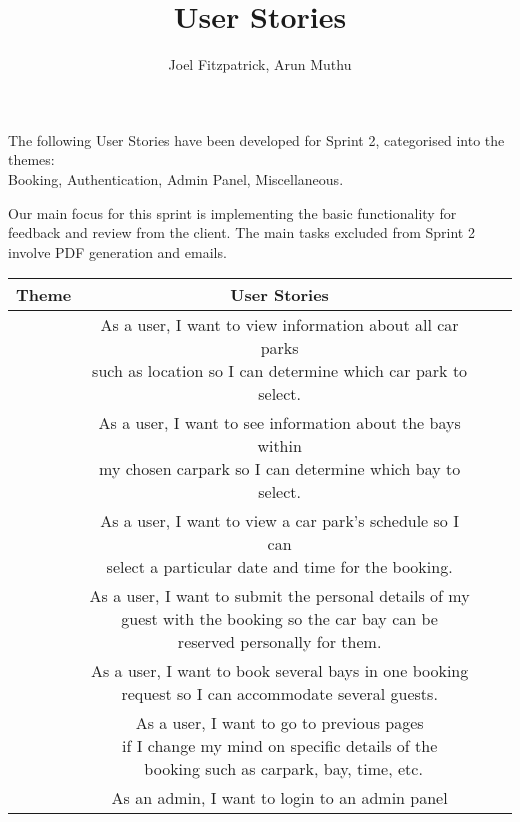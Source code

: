 \documentclass[a4paper, 10pt]{article}
\title{User Stories}
\author{Joel Fitzpatrick, Arun Muthu}
\begin{document}
\setlength{\headsep}{0pt}

\maketitle

\noindent
The following User Stories have been developed for Sprint 2, categorised into the themes: \\
Booking, Authentication, Admin Panel, Miscellaneous.

Our main focus for this sprint is implementing the basic functionality for feedback and review from the client. 
The main tasks excluded from Sprint 2 involve PDF generation and emails.

\vspace*{1em}
\begin{tabular}[hbt!]{|>{\centering\arraybackslash}m{7em}|c|c|c|}
    \hline
    Theme & User Stories \\
    \hline
    \multirow{6}{*}{Booking} & 
    \makecell{As a user, I want to view information about all car parks \\ 
    such as location so I can determine which car park to select.} \\
    \cline{2-2}
    & \makecell{As a user, I want to see information about the bays within \\
    my chosen carpark so I can determine which bay to select.} \\
    \cline{2-2}
    & \makecell{As a user, I want to view a car park’s schedule so I can \\ 
    select a particular date and time for the booking.} \\
    \cline{2-2}
    & \makecell{As a user, I want to submit the personal details of my \\ 
    guest with the booking so the car bay can be \\
    reserved personally for them.} \\
    \cline{2-2}
    & \makecell{As a user, I want to book several bays in one booking \\
    request so I can accommodate several guests.} \\
    \cline{2-2}
    & \makecell{As a user, I want to go to previous pages \\
    if I change my mind on specific details of the \\\
    booking such as carpark, bay, time, etc.} \\
    \hline
    \multirow{2}{*}{Authentication} & 
    \makecell{As an admin, I want to login to an admin panel \\ 
}
\end{tabular}
\end{document}
